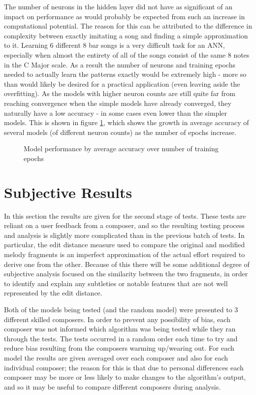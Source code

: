 \documentclass[ author={Stephen Livermore-Tozer},
				supervisor={Dr. Peter Flach},
				degree={MEng},
				title={Algorithmic Co-composition Using Machine Learning},
				subtitle={},
				type={research},
				year={2016} ]{dissertation}
\begin{document}
	The number of neurons in the hidden layer did not have as significant of an impact on performance as would probably be expected from such an increase in computational potential. The reason for this can be attributed to the difference in complexity between exactly imitating a song and finding a simple approximation to it. Learning 6 different 8 bar songs is a very difficult task for an ANN, especially when almost the entirety of all of the songs consist of the same 8 notes in the C Major scale. As a result the number of neurons and training epochs needed to actually learn the patterns exactly would be extremely high - more so than would likely be desired for a practical application (even leaving aside the overfitting). As the models with higher neuron counts are still quite far from reaching convergence when the simple models have already converged, they naturally have a low accuracy - in some cases even lower than the simpler models. This is shown in figure \ref{fig:elman-neurons-epochs-gradient}, which shows the growth in average accuracy of several models (of different neuron counts) as the number of epochs increase.
	
	\begin{figure}[h]
		\centering
		\caption{Model performance by average accuracy over number of training epochs}
		\label{fig:elman-neurons-epochs-gradient}
	\end{figure}
	
	\section{Subjective Results}
	
	In this section the results are given for the second stage of tests. These tests are reliant on a user feedback from a composer, and so the resulting testing process and analysis is slightly more complicated than in the previous batch of tests. In particular, the edit distance measure used to compare the original and modified melody fragments is an imperfect approximation of the actual effort required to derive one from the other. Because of this there will be some additional degree of subjective analysis focused on the similarity between the two fragments, in order to identify and explain any subtleties or notable features that are not well represented by the edit distance.
	
	Both of the models being tested (and the random model) were presented to 3 different skilled composers. In order to prevent any possibility of bias, each composer was not informed which algorithm was being tested while they ran through the tests. The tests occurred in a random order each time to try and reduce bias resulting from the composers warming up/wearing out. For each model the results are given averaged over each composer and also for each individual composer; the reason for this is that due to personal differences each composer may be more or less likely to make changes to the algorithm's output, and so it may be useful to compare different composers during analysis.
	
\end{document}
